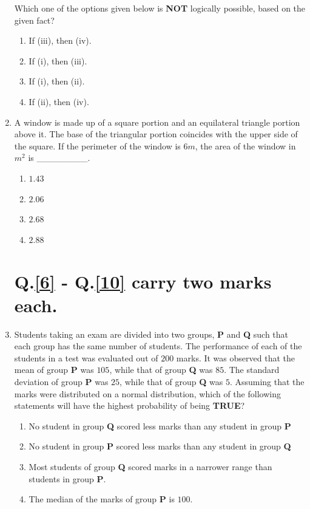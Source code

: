 \documentclass[journal]{IEEEtran}
\begin{document}
\begin{enumerate}
        Which one of the options given below is \textbf{NOT} logically possible, based on the given fact?
        \begin{enumerate}
            \item If (iii), then (iv).
            \item If (i), then (iii).
            \item If (i), then (ii).
            \item If (ii), then (iv).
        \end{enumerate}    
    \item \label{5} A window is made up of a square portion and an equilateral triangle portion above it. The base of the triangular portion coincides with the upper side of the square. If the perimeter of the window is $6 m$, the area of the window in $m^2$ is \_\_\_\_\_\_\_\_.
        \begin{enumerate}
            \item $1.43$
            \item $2.06$
            \item $2.68$
            \item $2.88$
        \end{enumerate}

    \section*{Q.\ref{6} - Q.\ref{10} carry two marks each.}
    \item \label{6} Students taking an exam are divided into two groups, \textbf{P} and \textbf{Q} such that each group has the same number of students. The performance of each of the students in a test was evaluated out of $200$ marks. It was observed that the mean of group \textbf{P} was $105$, while that of group \textbf{Q} was $85$. The standard deviation of group \textbf{P} was $25$, while that of group \textbf{Q} was $5$. Assuming that the marks were distributed on a normal distribution, which of the following statements will have the highest probability of being \textbf{TRUE}?
        \begin{enumerate}
            \item No student in group \textbf{Q} scored less marks than any student in group \textbf{P}
            \item No student in group \textbf{P} scored less marks than any student in group \textbf{Q}
            \item Most students of group \textbf{Q} scored marks in a narrower range than students in group \textbf{P}.
            \item The median of the marks of group \textbf{P} is $100$.
        \end{enumerate}


\end{enumerate}
\end{document}
